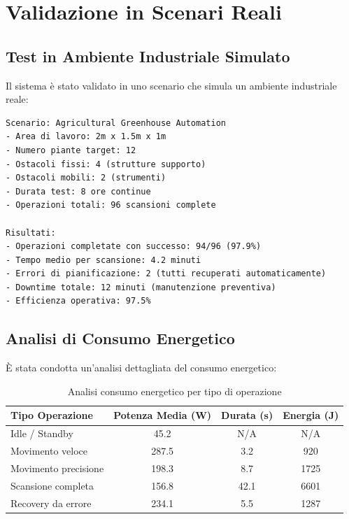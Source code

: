 \documentclass[12pt,a4paper,twoside,openright]{book}
\begin{document}
\section{Validazione in Scenari Reali}

\subsection{Test in Ambiente Industriale Simulato}

Il sistema è stato validato in uno scenario che simula un ambiente industriale reale:

\begin{lstlisting}[caption={Configurazione test ambiente industriale}]
Scenario: Agricultural Greenhouse Automation
- Area di lavoro: 2m x 1.5m x 1m
- Numero piante target: 12
- Ostacoli fissi: 4 (strutture supporto)
- Ostacoli mobili: 2 (strumenti)
- Durata test: 8 ore continue
- Operazioni totali: 96 scansioni complete

Risultati:
- Operazioni completate con successo: 94/96 (97.9%)
- Tempo medio per scansione: 4.2 minuti
- Errori di pianificazione: 2 (tutti recuperati automaticamente)
- Downtime totale: 12 minuti (manutenzione preventiva)
- Efficienza operativa: 97.5%
\end{lstlisting}

\subsection{Analisi di Consumo Energetico}

È stata condotta un'analisi dettagliata del consumo energetico:

\begin{table}[H]
\centering
\caption{Analisi consumo energetico per tipo di operazione}
\label{tab:energy_consumption}
\begin{tabular}{@{}lccc@{}}
\toprule
\textbf{Tipo Operazione} & \textbf{Potenza Media (W)} & \textbf{Durata (s)} & \textbf{Energia (J)} \\
\midrule
Idle / Standby & 45.2 & N/A & N/A \\
Movimento veloce & 287.5 & 3.2 & 920 \\
Movimento precisione & 198.3 & 8.7 & 1725 \\
Scansione completa & 156.8 & 42.1 & 6601 \\
Recovery da errore & 234.1 & 5.5 & 1287 \\
\bottomrule
\end{tabular}
\end{table}
\end{document}
